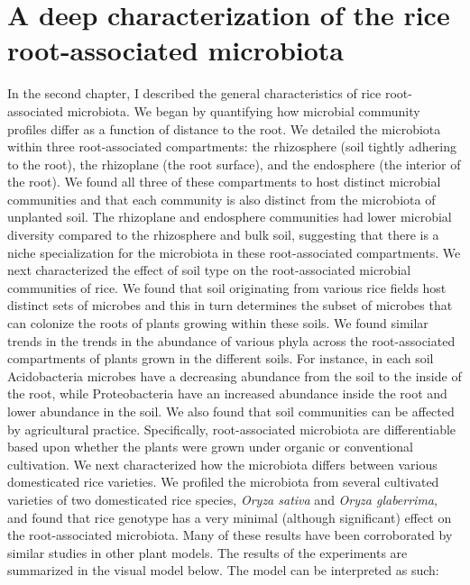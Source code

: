 \section{A deep characterization of the rice root-associated microbiota}
In the second chapter, I described the general characteristics of rice root-associated microbiota. We began by quantifying how microbial community profiles differ as a function of distance to the root. We detailed the microbiota within three root-associated compartments: the rhizosphere (soil tightly adhering to the root), the rhizoplane (the root surface), and the endosphere (the interior of the root). We found all three of these compartments to host distinct microbial communities and that each community is also distinct from the microbiota of unplanted soil. The rhizoplane and endosphere communities had lower microbial diversity compared to the rhizosphere and bulk soil, suggesting that there is a niche specialization for the microbiota in these root-associated compartments. We next characterized the effect of soil type on the root-associated microbial communities of rice. We found that soil originating from various rice fields host distinct sets of microbes and this in turn determines the subset of microbes that can colonize the roots of plants growing within these soils. We found similar trends in the trends in the abundance of various phyla across the root-associated compartments of plants grown in the different soils. For instance, in each soil Acidobacteria microbes have a decreasing abundance from the soil to the inside of the root, while Proteobacteria have an increased abundance inside the root and lower abundance in the soil. We also found that soil communities can be affected by agricultural practice. Specifically, root-associated microbiota are differentiable based upon whether the plants were grown under organic or conventional cultivation. We next characterized how the microbiota differs between various domesticated rice varieties. We profiled the microbiota from several cultivated varieties of two domesticated rice species, \textit{Oryza sativa} and \textit{Oryza glaberrima}, and found that rice genotype has a very minimal (although significant) effect on the root-associated microbiota. Many of these results have been corroborated by similar studies in other plant models. The results of the experiments are summarized in the visual model below. The model can be interpreted as such:
